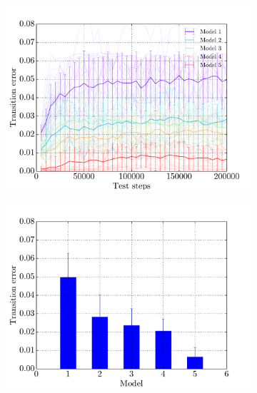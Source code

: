 \begin{figure}[!b]
    \centering
    \begin{subfigure}{0.48\textwidth}
    	\centering
        \includegraphics[width=\textwidth]{appendix/stdp_with_test_traces_distances}
        \caption{}
        \label{fig:stdp-with-trace}
    \end{subfigure}
    \hfill
    \begin{subfigure}{0.48\textwidth}
    	\centering
        \includegraphics[width=\textwidth]{appendix/stdp_with_performance_distances}
        \caption{}
        \label{fig:stdp-with-perf}
    \end{subfigure}
    \begin{subfigure}{0.48\textwidth}

\end{subfigure}
\end{figure}
